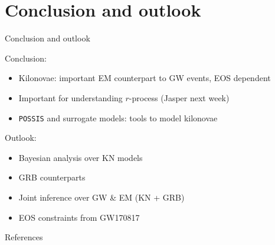 \documentclass[usenames,dvipsnames,t]{beamer}
\begin{document}
\section{Conclusion and outlook}

\begin{frame}{Conclusion and outlook}

  \def\x{3mm}
  \def\y{7mm}

  Conclusion: 
  \begin{itemize}
    \item Kilonovae: important EM counterpart to GW events, EOS dependent
    
    \vspace{\x}

    \item Important for understanding $r$-process (Jasper next week)
    
    \vspace{\x}

    \item \texttt{POSSIS} and surrogate models: tools to model kilonovae
  \end{itemize}


  \vspace{\y}

  Outlook:
  \begin{itemize}
    \item Bayesian analysis over KN models
    
    \vspace{\x}

    \item GRB counterparts
    
    \vspace{\x}

    \item Joint inference over GW \& EM (KN + GRB)
    
    \vspace{\x}

    \item EOS constraints from GW170817
    

  \end{itemize}  
  
\end{frame}


\begin{frame}{References}
  
  \printbibliography

\end{frame}
\end{document}
